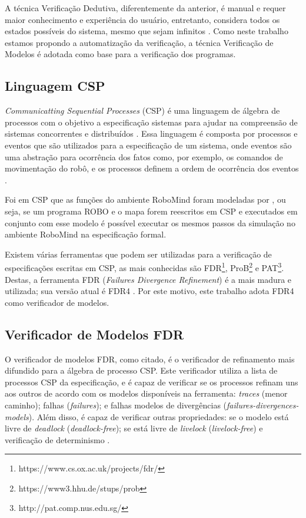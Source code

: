 A técnica Verificação Dedutiva, diferentemente da anterior, é manual e requer maior conhecimento e experiência do usuário, entretanto, considera todos os estados possíveis do sistema, mesmo que sejam infinitos \cite{FEIGN}. Como neste trabalho estamos propondo a automatização da verificação, a técnica Verificação de Modelos é adotada como base para a verificação dos programas.

\subsection{Linguagem CSP}
\textit{Communicatting Sequential Processes} (CSP) é uma linguagem de álgebra de processos com o objetivo a especificação sistemas para ajudar na compreensão de sistemas concorrentes e distribuídos \cite{Cleaveland2018}. Essa linguagem é composta por processos e eventos que são utilizados para a especificação de um sistema, onde eventos são uma abstração para ocorrência dos fatos como, por exemplo, os comandos de movimentação do robô, e os processos definem a ordem de ocorrência dos eventos \cite{Roscoe2010}.

Foi em CSP que as funções do ambiente RoboMind foram modeladas por \cite{nogueira}, ou seja, se um programa ROBO e o mapa forem reescritos em CSP e executados em conjunto com esse modelo é possível executar os mesmos passos da simulação no ambiente RoboMind na especificação formal.


Existem várias ferramentas que podem ser utilizadas para a verificação de especificações escritas em CSP, as mais conhecidas são FDR\footnote[3]{https://www.cs.ox.ac.uk/projects/fdr/}, ProB\footnote[4]{https://www3.hhu.de/stups/prob} e PAT\footnote[5]{http://pat.comp.nus.edu.sg/}. Destas, a ferramenta FDR (\textit{Failures Divergence Refinement}) é a mais madura e utilizada; sua versão atual é FDR4 \cite{Gibson}. Por este motivo, este trabalho adota FDR4 como verificador de modelos.

\subsection{Verificador de Modelos FDR}

O verificador de modelos FDR, como citado, é o verificador de refinamento mais difundido para a álgebra de processo CSP. Este verificador utiliza a lista de processos CSP da especificação, e é capaz de verificar se os processos refinam uns aos outros de acordo com os modelos disponíveis na ferramenta: \textit{traces} (menor caminho); falhas (\textit{failures}); e falhas modelos de divergências (\textit{failures-divergences-models}). Além disso, é capaz de verificar outras propriedades: se o modelo está livre de \textit{deadlock} (\textit{deadlock-free}); se está livre de \textit{livelock} (\textit{livelock-free}) e verificação de determinismo \cite{Gibson}.


